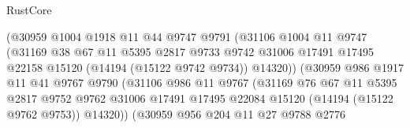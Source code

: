 \begin{lexlean}{RustCore}
\begin{coremodule}
                                (@30959
                                  @1004
                                  @1918
                                  @11
                                  @44
                                  @9747
                                  @9791
                                  (@31106
                                    @1004
                                    @11
                                    @9747
                                    (@31169
                                      @38
                                      @67
                                      @11
                                      @5395
                                      @2817
                                      @9733
                                      @9742
                                      @31006
                                      @17491
                                      @17495
                                      @22158
                                      @15120
                                      (@14194 (@15122 @9742 @9734))
                                      @14320))
                                  (@30959
                                    @986
                                    @1917
                                    @11
                                    @41
                                    @9767
                                    @9790
                                    (@31106
                                      @986
                                      @11
                                      @9767
                                      (@31169
                                        @76
                                        @67
                                        @11
                                        @5395
                                        @2817
                                        @9752
                                        @9762
                                        @31006
                                        @17491
                                        @17495
                                        @22084
                                        @15120
                                        (@14194 (@15122 @9762 @9753))
                                        @14320))
                                    (@30959
                                      @956
                                      @204
                                      @11
                                      @27
                                      @9788
                                      @2776

\end{coremodule}
\end{lexlean}
